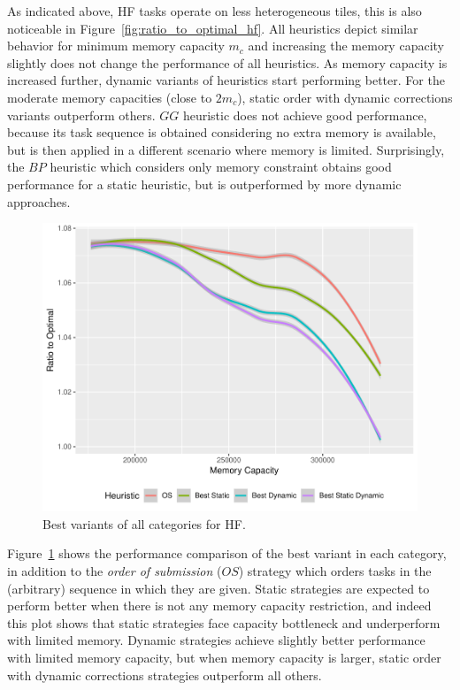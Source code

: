 \documentclass[sigconf]{acmart}
\begin{document}
{		As indicated above, HF tasks operate on less heterogeneous tiles, this is also noticeable in Figure~\ref{fig:ratio_to_optimal_hf}. All heuristics depict similar behavior for minimum memory capacity $m_c$ and increasing the memory capacity slightly does not change the performance of all heuristics. As memory capacity is increased further, dynamic variants of heuristics start performing better. For the moderate memory capacities (close to $2m_c$), static order with dynamic corrections variants outperform others. $GG$ heuristic does not achieve good performance, because its task sequence is obtained considering no extra memory is available, but is then applied in a different scenario where memory is limited. Surprisingly, the $BP$ heuristic which considers only memory constraint obtains good performance for a static heuristic, but is outperformed by more dynamic approaches.
		
		\begin{figure}[htb]
			\includegraphics[scale=0.5]{./results/ratio_to_optimal_hf-best.pdf}
			\caption{Best variants of all categories for HF.}
			\label{fig:ratio_to_optimal_best_hf}
		\end{figure}
		
		
		Figure~\ref{fig:ratio_to_optimal_best_hf} shows the performance comparison of the best variant in each category, in addition to the \textit{order of submission} ($OS$) strategy which orders tasks in the (arbitrary) sequence in which they are given. Static strategies are expected to perform better when there is not any memory capacity restriction, and indeed this plot shows that static strategies face capacity bottleneck and underperform with limited memory. Dynamic strategies achieve slightly better performance with limited memory capacity, but when memory capacity is larger, static order with dynamic corrections strategies outperform all others.
		
}
\end{document}
